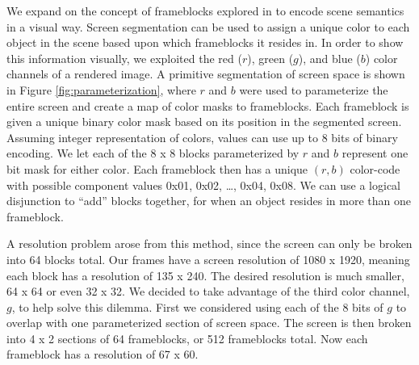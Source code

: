 \documentclass[conference]{IEEEtran}
\begin{document}
We expand on the concept of frameblocks explored in \cite{thesis_harris}
to encode scene semantics in a visual way.
Screen segmentation can be used to assign a unique color to each object in the scene
based upon which frameblocks it resides in.
In order to show this information visually, we exploited the
red ($r$), green ($g$), and blue ($b$) color channels of a rendered image.
A primitive segmentation of screen space is shown in Figure \ref{fig:parameterization},
where $r$ and $b$ were used to parameterize the entire screen
and create a map of color masks to frameblocks.
Each frameblock is given a unique binary color mask based on its position
in the segmented screen.
Assuming integer representation of colors,
values can use up to 8 bits of binary encoding.
We let each of the 8 x 8 blocks parameterized by $r$ and $b$ represent one bit mask
for either color.
Each frameblock then has a unique $(r,b)$ color-code
with possible component values 0x01, 0x02, \dots, 0x04, 0x08.
We can use a logical disjunction to ``add'' blocks together, for when
an object resides in more than one frameblock.

A resolution problem arose from this method, since the screen can only be broken into 64 blocks total.
Our frames have a screen resolution of 1080 x 1920, meaning each block has
a resolution of 135 x 240. The desired resolution is much smaller, 64 x 64
or even 32 x 32.
We decided to take advantage of the third color channel, $g$, to help solve this dilemma.
First we considered using each of the 8 bits of $g$
to overlap with one parameterized section of screen space.
The screen is then broken into 4 x 2 sections of 64 frameblocks, or 512 frameblocks total.
Now each frameblock has a resolution of 67 x 60.
\end{document}

